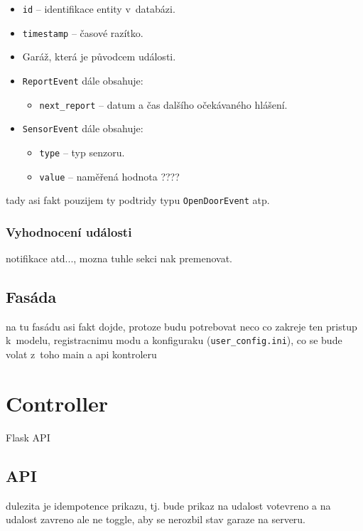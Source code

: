 \begin{itemize}
    \item \texttt{id} -- identifikace entity v~databázi.
    \item \texttt{timestamp} -- časové razítko.
    \item Garáž, která je původcem události.
    \item \texttt{ReportEvent} dále obsahuje:
        \begin{itemize}
            \item \texttt{next\_report} -- datum a čas dalšího očekávaného hlášení.
        \end{itemize}
    \item \texttt{SensorEvent} dále obsahuje:
        \begin{itemize}
            \item \texttt{type} -- typ senzoru.
            \item \texttt{value} -- naměřená hodnota ????
        \end{itemize}
\end{itemize}

tady asi fakt pouzijem ty podtridy typu \texttt{OpenDoorEvent} atp.

\subsubsection{Vyhodnocení události}

notifikace atd..., mozna tuhle sekci nak premenovat.

\subsection{Fasáda}

na tu fasádu asi fakt dojde, protoze budu potrebovat neco co zakreje ten pristup k~modelu, registracnimu modu a konfiguraku (\texttt{user\_config.ini}), co se bude volat z~toho main a api kontroleru

\section{Controller}

Flask API

\subsection{API}

dulezita je idempotence prikazu, tj. bude prikaz na udalost votevreno a na udalost zavreno ale ne toggle, aby se nerozbil stav garaze na serveru.

